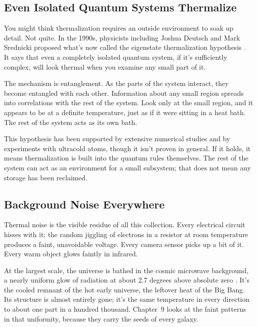 \subsection{Even Isolated Quantum Systems Thermalize}

You might think thermalization requires an outside environment to soak up detail. Not quite. In the 1990s, physicists including Joshua Deutsch and Mark Srednicki proposed what's now called the eigenstate thermalization hypothesis \cite{deutsch1991,srednicki1994}. It says that even a completely isolated quantum system, if it's sufficiently complex, will look thermal when you examine any small part of it.

The mechanism is entanglement. As the parts of the system interact, they become entangled with each other. Information about any small region spreads into correlations with the rest of the system. Look only at the small region, and it appears to be at a definite temperature, just as if it were sitting in a heat bath. The rest of the system acts as its own bath.

This hypothesis has been supported by extensive numerical studies and by experiments with ultracold atoms, though it isn't proven in general. If it holds, it means thermalization is built into the quantum rules themselves. The rest of the system can act as an environment for a small subsystem; that does not mean any storage has been reclaimed.

\subsection{Background Noise Everywhere}

Thermal noise is the visible residue of all this collection. Every electrical circuit hisses with it; the random jiggling of electrons in a resistor at room temperature produces a faint, unavoidable voltage. Every camera sensor picks up a bit of it. Every warm object glows faintly in infrared.

At the largest scale, the universe is bathed in the cosmic microwave background, a nearly uniform glow of radiation at about 2.7 degrees above absolute zero \cite{smoot1992}. It's the cooled remnant of the hot early universe, the leftover heat of the Big Bang. Its structure is almost entirely gone; it's the same temperature in every direction to about one part in a hundred thousand. Chapter~9 looks at the faint patterns in that uniformity, because they carry the seeds of every galaxy.

